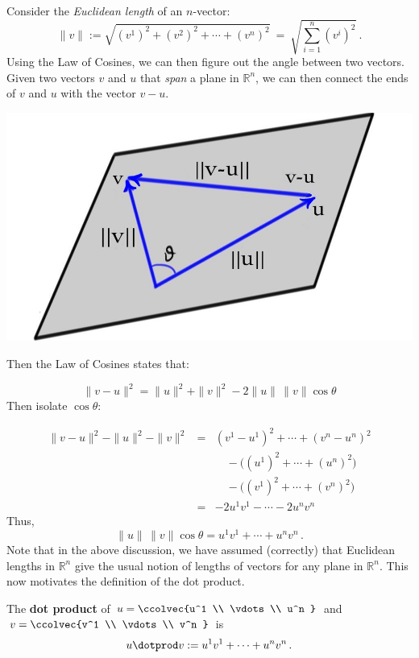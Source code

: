 Consider the {\it Euclidean length} of an $n$-vector: 
\[
\|v\| := \sqrt{(v^1)^2 + (v^2)^2+\cdots+(v^n)^2}\ =\ \sqrt{ \sum_{i=1}^n (v^i)^2 }\: .
\]
Using the Law of Cosines, we can then figure out the angle between two vectors.  Given two vectors $v$ and $u$ that {\it span} a plane in $\mathbb{R}^n$, we can then connect the ends of $v$ and $u$ with the vector $v-u$. 
 \begin{center}
\includegraphics[scale=.24]{triangleineq.jpg}
\end{center}
Then the Law of Cosines states that:

\[ 
\|v-u\|^2 = \|u\|^2 + \|v\|^2 - 2\|u\|\,  \|v\| \cos \theta 
\]
Then isolate $\cos \theta$:

\begin{eqnarray*}
\|v-u\|^2 - \|u\|^2 - \|v\|^2 &=& (v^1-u^1)^2 + \cdots + (v^n-u^n)^2 \\
& & \quad - \big((u^1)^2 + \cdots + (u^n)^2\big) \\
& & \quad - \big((v^1)^2 + \cdots + (v^n)^2\big) \\
& = & -2 u^1v^1 - \cdots - 2u^nv^n
\end{eqnarray*}
Thus, 
\[
\|u\|\, \|v\| \cos \theta = u^1v^1 + \cdots + u^nv^n\, .
\]
Note that in the above discussion, we have assumed (correctly) that Euclidean lengths in ${\mathbb R}^n$
give the usual notion of lengths of vectors for any plane in ${\mathbb R}^n$. This now motivates the definition of the dot product.

\begin{definition} 
The {\bf dot product} of $u=\ccolvec{u^1 \\ \vdots \\ u^n }$ and $v=\ccolvec{v^1 \\ \vdots \\ v^n }$ is 
\[u\dotprod v := u^1v^1 + \cdots + u^nv^n\, .\]
\end{definition} 

